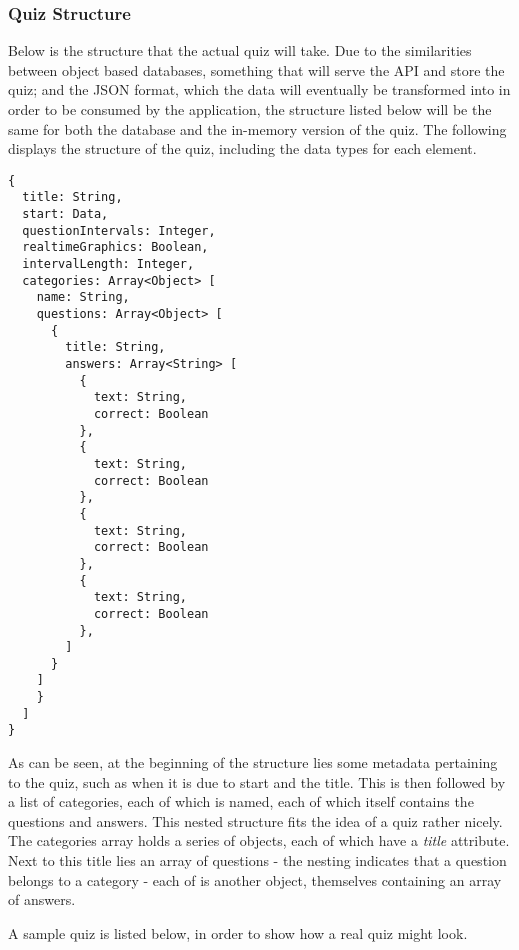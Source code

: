 \subsubsection{Quiz Structure}
Below is the structure that the actual quiz will take. Due to the similarities between object based databases, something that will serve the API and store the quiz; and the JSON format, which the data will eventually be transformed into in order to be consumed by the application, the structure listed below will be the same for both the database and the in-memory version of the quiz. The following displays the structure of the quiz, including the data types for each element.

\begin{verbatim}
{
  title: String,
  start: Data,
  questionIntervals: Integer,
  realtimeGraphics: Boolean,
  intervalLength: Integer,
  categories: Array<Object> [
    name: String,
    questions: Array<Object> [
      {
        title: String,
        answers: Array<String> [
          {
            text: String,
            correct: Boolean
          },
          {
            text: String,
            correct: Boolean
          },
          {
            text: String,
            correct: Boolean
          },
          {
            text: String,
            correct: Boolean
          },
        ]
      }
    ]
    }
  ]
}
\end{verbatim}

As can be seen, at the beginning of the structure lies some metadata pertaining to the quiz, such as when it is due to start and the title. This is then followed by a list of categories, each of which is named, each of which itself contains the questions and answers. This nested structure fits the idea of a quiz rather nicely. The categories array holds a series of objects, each of which have a \textit{title} attribute. Next to this title lies an array of questions - the nesting indicates that a question belongs to a category - each of is another object, themselves containing an array of answers.

A sample quiz is listed below, in order to show how a real quiz might look.

